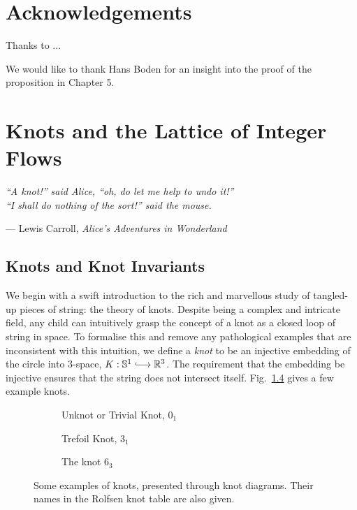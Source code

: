 \documentclass[12pt]{report}
\newcommand{\R}{\mathbb{R}}
\renewcommand{\S}{\mathbb{S}}
\begin{document}
\chapter*{Acknowledgements}

Thanks to ...

We would like to thank Hans Boden for an insight into the proof of the proposition in Chapter 5.


\chapter{Knots and the Lattice of Integer Flows}
\epigraph{\itshape ``A knot!'' said Alice, ``oh, do let me help to undo it!''\\``I shall do nothing of the sort!'' said the mouse.}{--- Lewis Carroll, \textit{Alice's Adventures in Wonderland}}

\section{Knots and Knot Invariants}

We begin with a swift introduction to the rich and marvellous study of tangled-up pieces of string: the theory of knots. Despite being a complex and intricate field, any child can intuitively grasp the concept of a knot as a closed loop of string in space. To formalise this and remove any pathological examples that are inconsistent with this intuition, we define a \textit{knot} to be an injective embedding of the circle into $3$-space, $K: \S^{1} \lhook\joinrel\longrightarrow \R^{3}$. The requirement that the embedding be injective ensures that the string does not intersect itself. Fig.~\ref{fig:knot-examples} gives a few example knots.

\begin{figure}[hbt!]
	\centering
	\hspace*{\fill}
	\begin{subfigure}[b]{0.3 \textwidth}
		\centering
		\def\svgscale{0.2}
		
		\caption{Unknot or Trivial Knot, $0_{1}$}
		\label{fig:unknot}
	\end{subfigure}
	\hspace*{\fill}
	\begin{subfigure}[b]{0.3 \textwidth}
		\centering
		\def\svgscale{0.2}
		
		\caption{Trefoil Knot, $3_{1}$}
		\label{fig:trefoil}
	\end{subfigure}
	\hspace*{\fill}
	\begin{subfigure}[b]{0.3 \textwidth}
		\centering
		\def\svgscale{0.2}
		
		\caption{The knot $6_{3}$}
		\label{fig:6-3-knot}
	\end{subfigure}
	\caption{Some examples of knots, presented through knot diagrams. Their names in the Rolfsen knot table are also given.}
	\label{fig:knot-examples}
	\hspace*{\fill} 
\end{figure}
\end{document}
